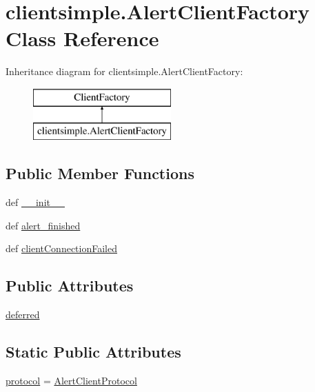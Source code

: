 \hypertarget{classclientsimple_1_1_alert_client_factory}{\section{clientsimple.\-Alert\-Client\-Factory Class Reference}
\label{classclientsimple_1_1_alert_client_factory}
}
Inheritance diagram for clientsimple.\-Alert\-Client\-Factory\-:\begin{figure}[H]
\begin{center}
\leavevmode
\includegraphics[height=2.000000cm]{d2/d1c/classclientsimple_1_1_alert_client_factory}
\end{center}
\end{figure}
\subsection*{Public Member Functions}
\begin{DoxyCompactItemize}
\item 
def \hyperlink{classclientsimple_1_1_alert_client_factory_abb581e29db4327caa7a1ca6d50b656a9}{\-\_\-\-\_\-init\-\_\-\-\_\-}
\item 
def \hyperlink{classclientsimple_1_1_alert_client_factory_a0741a76118880556daa6a7a1c810b9fb}{alert\-\_\-finished}
\item 
def \hyperlink{classclientsimple_1_1_alert_client_factory_a140bcc1b6005968f0f8dcc919290fcea}{client\-Connection\-Failed}
\end{DoxyCompactItemize}
\subsection*{Public Attributes}
\begin{DoxyCompactItemize}
\item 
\hyperlink{classclientsimple_1_1_alert_client_factory_a944edc2575a1528d6b5c3b7bfe07906b}{deferred}
\end{DoxyCompactItemize}
\subsection*{Static Public Attributes}
\begin{DoxyCompactItemize}
\item 
\hyperlink{classclientsimple_1_1_alert_client_factory_a8407b6a35b081ae3536cfac79015e780}{protocol} = \hyperlink{classclientsimple_1_1_alert_client_protocol}{Alert\-Client\-Protocol}
\end{DoxyCompactItemize}


